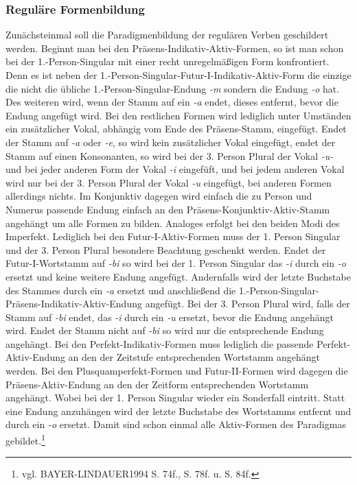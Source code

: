 \documentclass[12pt,abstract=on]{scrreprt}
\begin{document}
\subsubsection{Reguläre Formenbildung}
Zunächsteinmal soll die Paradigmenbildung der regulären Verben geschildert werden. Beginnt man bei den Präsens-Indikativ-Aktiv-Formen, so ist man schon bei der 1.-Person-Singular mit einer recht unregelmäßigen Form konfrontiert. Denn es ist neben der 1.-Person-Singular-Futur-I-Indikativ-Aktiv-Form die einzige die nicht die übliche 1.-Person-Singular-Endung \textit{-m} sondern die Endung \textit{-o} hat. Des weiteren wird, wenn der Stamm auf ein \textit{-a} endet, dieses entfernt, bevor die Endung angefügt wird. Bei den restlichen Formen wird lediglich unter Umständen ein zusätzlicher Vokal, abhängig vom Ende des Präsens-Stamm, eingefügt. Endet der Stamm auf \textit{-a} oder \textit{-e}, so wird kein zusätzlicher Vokal eingefügt, endet der Stamm auf einen Konsonanten, so wird bei der 3. Person Plural der Vokal \textit{-u-} und bei jeder anderen Form der Vokal \textit{-i} eingefüft, und bei jedem anderen Vokal wird nur bei der 3. Person Plural der Vokal \textit{-u} eingefügt, bei anderen Formen allerdings nichts. Im Konjunktiv dagegen wird einfach die zu Person und Numerus passende Endung einfach an den Präsens-Konjunktiv-Aktiv-Stamm angehängt um alle Formen zu bilden. Analoges erfolgt bei den beiden Modi des Imperfekt. Lediglich bei den Futur-I-Aktiv-Formen muss der 1. Person Singular und der 3. Person Plural besondere Beachtung geschenkt werden. Endet der Futur-I-Wortstamm auf \textit{-bi} so wird bei der 1. Person Singular das \textit{-i} durch ein \textit{-o} ersetzt und keine weitere Endung angefügt. Andernfalls wird der letzte Buchstabe des Stammes durch ein \textit{-a} ersetzt und anschließend die 1.-Person-Singular-Präsens-Indikativ-Aktiv-Endung angefügt. Bei der 3. Person Plural wird, falls der Stamm auf \textit{-bi} endet, das \textit{-i} durch ein \textit{-u} ersetzt, bevor die Endung angehängt wird. Endet der Stamm nicht auf \textit{-bi} so wird nur die entsprechende Endung angehängt. Bei den Perfekt-Indikativ-Formen muss lediglich die passende Perfekt-Aktiv-Endung an den der Zeitstufe entsprechenden Wortstamm angehängt werden. Bei den Plusquamperfekt-Formen und Futur-II-Formen wird dagegen die Präsens-Aktiv-Endung an den der Zeitform entsprechenden Wortstamm angehängt. Wobei bei der 1. Person Singular wieder ein Sonderfall eintritt. Statt eine Endung anzuhängen wird der letzte Buchstabe des Wortstamms entfernt und durch ein \textit{-o} ersetzt. Damit sind schon einmal alle Aktiv-Formen des Paradigmas gebildet.\footnote{vgl. BAYER-LINDAUER1994 S. 74f., S. 78f. u. S. 84f.} \par
\end{document}
